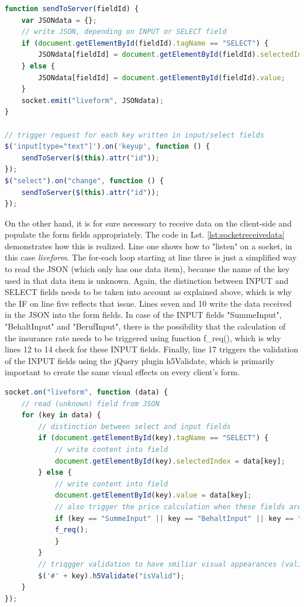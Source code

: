 \begin{lstlisting}[float,
language=javascript,
caption={Sending data to the server},
label={lst:socketsenddata}]
function sendToServer(fieldId) {
    var JSONdata = {};
    // write JSON, depending on INPUT or SELECT field
    if (document.getElementById(fieldId).tagName == "SELECT") {
        JSONdata[fieldId] = document.getElementById(fieldId).selectedIndex;
    } else {
        JSONdata[fieldId] = document.getElementById(fieldId).value;
    }
    socket.emit("liveform", JSONdata);
}

// trigger request for each key written in input/select fields
$('input[type="text"]').on('keyup', function () {
    sendToServer($(this).attr("id"));
});
$("select").on("change", function () {
    sendToServer($(this).attr("id"));
});
\end{lstlisting}%

On the other hand, it is for sure necessary to receive data on the client-side and populate the form fields appropriately. The code in Lst. \ref{lst:socketreceivedata} demonstrates how this is realized. Line one shows how to "listen" on a socket, in this case \textit{liveform}. The for-each loop starting at line three is just a simplified way to read the JSON (which only has one data item), because the name of the key used in that data item is unknown. Again, the distinction between INPUT and SELECT fields needs to be taken into account as explained above, which is why the IF on line five reflects that issue. Lines seven and 10 write the data received in the JSON into the form fields. In case of the INPUT fields "SummeInput", "BehaltInput" and "BerufInput", there is the possibility that the calculation of the insurance rate needs to be triggered using function f\_req(), which is why lines 12 to 14 check for these INPUT fields. Finally, line 17 triggers the validation of the INPUT fields using the jQuery plugin h5Validate, which is primarily important to create the same visual effects on every client's form.

\begin{lstlisting}[float,
language=javascript,
caption={Receiving data using WebSockets},
label={lst:socketreceivedata}]
socket.on("liveform", function (data) {
    // read (unknown) field from JSON
    for (key in data) {
        // distinction between select and input fields
        if (document.getElementById(key).tagName == "SELECT") {
            // write content into field
            document.getElementById(key).selectedIndex = data[key];
        } else {
            // write content into field
            document.getElementById(key).value = data[key];
            // also trigger the price calculation when these fields are filled
            if (key == "SummeInput" || key == "BehaltInput" || key == "BerufInput") {
            f_req();
            }
        }
        // triqgger validation to have smiliar visual appearances (valid/invalid) for the fields
        $('#' + key).h5Validate("isValid");
    }
});
\end{lstlisting}%

